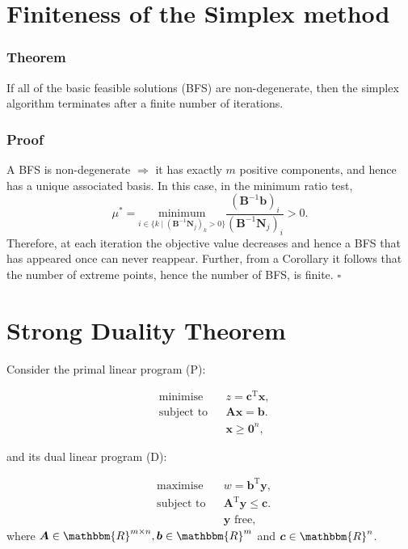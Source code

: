 \documentclass[12pt, a4paper]{article}
\begin{document}
\section{Finiteness of the Simplex method}
\subsubsection*{Theorem}
If all of the basic feasible solutions (BFS) are non-degenerate, then the simplex algorithm terminates after a finite number of iterations.
\subsubsection*{Proof}
A BFS is non-degenerate $\Rightarrow$ it has exactly $m$ positive components, and hence has a unique associated basis. In this case, in the minimum ratio test,
\begin{equation*}
\mu^* = \underset{i\in\{ k\; |\; (\bm{B}^{-1}\bm{N}_j)_k > 0\}}{\text{ minimum }} \frac{(\bm{B}^{-1}\bm{b})_i}{(\bm{B}^{-1}\bm{N}_j)_i}>0.
\end{equation*}
Therefore, at each iteration the objective value decreases and hence a BFS that has appeared once can never reappear. Further, from a Corollary it follows that the number of extreme points, hence the number of BFS, is finite. $\square$

\section{Strong Duality Theorem}
Consider the primal linear program (P):

\begin{equation*}
\begin{aligned}
& {\text{minimise}}
& & z=\bm{c}^{\text{T}}\bm{x}, \\
& \text{subject to}
& & \bm{Ax}=\bm{b}. \\
&&& \bm{x} \geq \bm{0}^n,
\end{aligned}
\end{equation*}

and its dual linear program (D):

\begin{equation*}
\begin{aligned}
& {\text{maximise}}
& & w=\bm{b}^{\text{T}}\bm{y}, \\
& \text{subject to}
& & \bm{A}^{\text{T}}\bm{y}\leq\bm{c}. \\
&&& \bm{y} \text{ free,}
\end{aligned}
\end{equation*}
where $\bm{A}\in\mathbbm{R}^{m \times n}, \bm{b}\in\mathbbm{R}^m$ and $\bm{c}\in\mathbbm{R}^n$.
\end{document}
